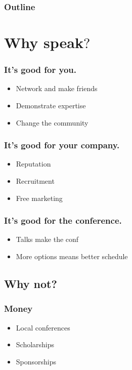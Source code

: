 \documentclass{beamer}
\begin{document}
\begin{frame}[fragile]
\frametitle{Outline}
\tableofcontents[pausesections]
\end{frame}

\section{Why speak$?$}

\begin{frame}[fragile]
\tableofcontents[currentsection]
\end{frame}

\begin{frame}[fragile]
\frametitle{It's good for you.}
\begin{itemize}[<+(1)->]
\item Network and make friends
\item Demonstrate expertise
\item Change the community
\end{itemize}
\end{frame}

\begin{frame}[fragile]
\frametitle{It's good for your company.}
\begin{itemize}[<+(1)->]
\item Reputation
\item Recruitment
\item Free marketing
\end{itemize}
\end{frame}

\begin{frame}[fragile]
\frametitle{It's good for the conference.}
\begin{itemize}[<+(1)->]
\item Talks make the conf
\item More options means better schedule
\end{itemize}
\end{frame}

\subsection{Why not?}

\begin{frame}[fragile]
\tableofcontents[currentsubsection]
\end{frame}


\begin{frame}[fragile]
\frametitle{Money}
\begin{itemize}[<+(1)->]
\item Local conferences
\item Scholarships
\item Sponsorships
\end{itemize}
\end{frame}
\end{document}
